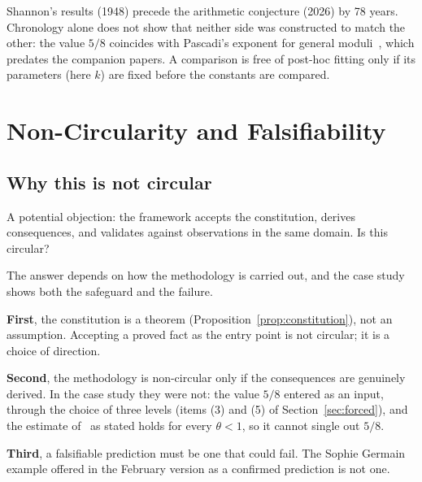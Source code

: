 \documentclass[12pt]{amsart}
\theoremstyle{plain}
\theoremstyle{definition}
\theoremstyle{remark}
\begin{document}
Shannon's results (1948) precede the arithmetic conjecture (2026) by 78 years.
Chronology alone does not show that neither side was constructed to match the
other: the value $5/8$ coincides with Pascadi's exponent for general
moduli~\cite{Pascadi2025}, which predates the companion papers. A comparison is
free of post-hoc fitting only if its parameters (here $k$) are fixed before the
constants are compared.

\section{Non-Circularity and Falsifiability}

\subsection{Why this is not circular}
\label{sec:noncircular}

A potential objection: the framework accepts the constitution, derives
consequences, and validates against observations in the same domain. Is this
circular?

The answer depends on how the methodology is carried out, and the case study
shows both the safeguard and the failure.

\textbf{First}, the constitution is a theorem (Proposition~\ref{prop:constitution}),
not an assumption. Accepting a proved fact as the entry point is not circular;
it is a choice of direction.

\textbf{Second}, the methodology is non-circular only if the consequences are
genuinely derived. In the case study they were not: the value $5/8$ entered as
an input, through the choice of three levels (items (3) and (5) of
Section~\ref{sec:forced}), and the estimate of~\cite{WakilEisenstein} as stated
holds for every $\theta < 1$, so it cannot single out $5/8$.

\textbf{Third}, a falsifiable prediction must be one that could fail. The
Sophie Germain example offered in the February version as a confirmed
prediction is not one.
\end{document}
